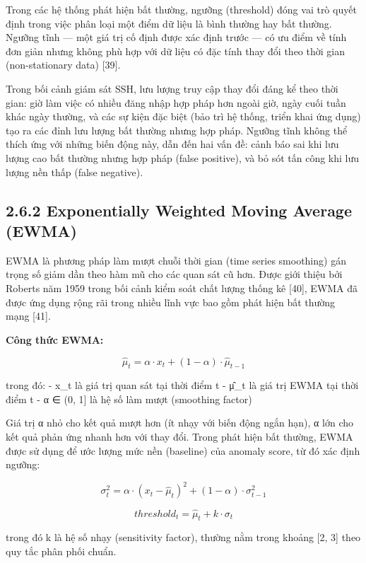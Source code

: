 \documentclass[
  a4paper]{report}
\begin{document}
Trong các hệ thống phát hiện bất thường, ngưỡng (threshold) đóng vai trò
quyết định trong việc phân loại một điểm dữ liệu là bình thường hay bất
thường. Ngưỡng tĩnh --- một giá trị cố định được xác định trước --- có
ưu điểm về tính đơn giản nhưng không phù hợp với dữ liệu có đặc tính
thay đổi theo thời gian (non-stationary data) {[}39{]}.

Trong bối cảnh giám sát SSH, lưu lượng truy cập thay đổi đáng kể theo
thời gian: giờ làm việc có nhiều đăng nhập hợp pháp hơn ngoài giờ, ngày
cuối tuần khác ngày thường, và các sự kiện đặc biệt (bảo trì hệ thống,
triển khai ứng dụng) tạo ra các đỉnh lưu lượng bất thường nhưng hợp
pháp. Ngưỡng tĩnh không thể thích ứng với những biến động này, dẫn đến
hai vấn đề: cảnh báo sai khi lưu lượng cao bất thường nhưng hợp pháp
(false positive), và bỏ sót tấn công khi lưu lượng nền thấp (false
negative).

\subsection{2.6.2 Exponentially Weighted Moving Average
(EWMA)}\label{exponentially-weighted-moving-average-ewma}

EWMA là phương pháp làm mượt chuỗi thời gian (time series smoothing) gán
trọng số giảm dần theo hàm mũ cho các quan sát cũ hơn. Được giới thiệu
bởi Roberts năm 1959 trong bối cảnh kiểm soát chất lượng thống kê
{[}40{]}, EWMA đã được ứng dụng rộng rãi trong nhiều lĩnh vực bao gồm
phát hiện bất thường mạng {[}41{]}.

\textbf{Công thức EWMA:}

\[\hat{\mu}_t = \alpha \cdot x_t + (1 - \alpha) \cdot \hat{\mu}_{t-1}\]

trong đó: - x\_t là giá trị quan sát tại thời điểm t - μ̂\_t là giá trị
EWMA tại thời điểm t - α ∈ (0, 1{]} là hệ số làm mượt (smoothing factor)

Giá trị α nhỏ cho kết quả mượt hơn (ít nhạy với biến động ngắn hạn), α
lớn cho kết quả phản ứng nhanh hơn với thay đổi. Trong phát hiện bất
thường, EWMA được sử dụng để ước lượng mức nền (baseline) của anomaly
score, từ đó xác định ngưỡng:

\[\sigma_t^2 = \alpha \cdot (x_t - \hat{\mu}_t)^2 + (1 - \alpha) \cdot \sigma_{t-1}^2\]

\[threshold_t = \hat{\mu}_t + k \cdot \sigma_t\]

trong đó k là hệ số nhạy (sensitivity factor), thường nằm trong khoảng
{[}2, 3{]} theo quy tắc phân phối chuẩn.
\end{document}
